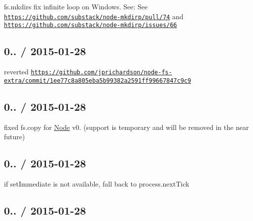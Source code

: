 \begin{DoxyItemize}
\item {\ttfamily fs.\+mkdirs} fix infinite loop on Windows. See\+: See \href{https://github.com/substack/node-mkdirp/pull/74}{\tt https\+://github.\+com/substack/node-\/mkdirp/pull/74} and \href{https://github.com/substack/node-mkdirp/issues/66}{\tt https\+://github.\+com/substack/node-\/mkdirp/issues/66}
\end{DoxyItemize}

\subsection*{0.. / 2015-\/01-\/28 }


\begin{DoxyItemize}
\item reverted \href{https://github.com/jprichardson/node-fs-extra/commit/1ee77c8a805eba5b99382a2591ff99667847c9c9}{\tt https\+://github.\+com/jprichardson/node-\/fs-\/extra/commit/1ee77c8a805eba5b99382a2591ff99667847c9c9}
\end{DoxyItemize}

\subsection*{0.. / 2015-\/01-\/28 }


\begin{DoxyItemize}
\item fixed {\ttfamily fs.\+copy} for \mbox{\hyperlink{classNode}{Node}} v0. (support is temporary and will be removed in the near future)
\end{DoxyItemize}

\subsection*{0.. / 2015-\/01-\/28 }


\begin{DoxyItemize}
\item if {\ttfamily set\+Immediate} is not available, fall back to {\ttfamily process.\+next\+Tick}
\end{DoxyItemize}

\subsection*{0.. / 2015-\/01-\/28 }


